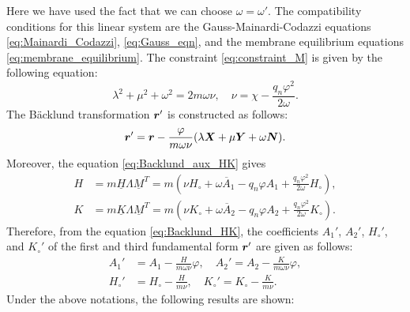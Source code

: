 \documentclass[a4paper]{amsart}
\def\br{\mbox{\boldmath $r$}}
\def\bH{\underline{H}}
\def\bK{\underline{K}}
\def\uM{\underline{M}}
\def\bN{\mbox{\boldmath $N$}}
\def\bX{\mbox{\boldmath $X$}}
\def\bY{\mbox{\boldmath $Y$}}
\theoremstyle{definition}
\begin{document}
Here we have used the fact that we can choose $\omega = \omega'$.
The compatibility conditions for this linear system are the Gauss-Mainardi-Codazzi equations \eqref{eq:Mainardi_Codazzi}, \eqref{eq:Gauss_eqn}, and the membrane equilibrium equations \eqref{eq:membrane_equilibrium}.
The constraint \eqref{eq:constraint_M} is given by the following equation:
\begin{equation}
\lambda^2 + \mu^2 + \omega^2 = 2m \omega \nu, \quad
\nu = \chi - \frac{q_n \varphi^2}{2\omega}.
\end{equation}
The B\"acklund transformation $\br'$ is constructed as follows:
\begin{equation}
\label{eq:Backlund}
\br' = \br - \frac{\varphi}{m\omega\nu} (\lambda \bX + \mu \bY + \omega \bN).
\end{equation}
Moreover, the equation \eqref{eq:Backlund_aux_HK} gives
\begin{equation}
\label{eq:eqn_H_K}
\begin{aligned}
H &= m \bH \Lambda \uM^T
= m \left( \nu H_\circ + \omega \overline{A}_1 - q_n \varphi A_1 + \frac{q_n \varphi^2}{2\omega} H_\circ \right),\\
K &= m \bK \Lambda \uM^T
= m \left( \nu K_\circ + \omega \overline{A}_2 - q_n \varphi A_2 + \frac{q_n \varphi^2}{2\omega} K_\circ \right).
\end{aligned}
\end{equation}
Therefore, from the equation \eqref{eq:Backlund_HK}, the coefficients $A_1'$, $A_2'$, $H_\circ'$, and $K_\circ'$ of the first and third fundamental form $\br'$ are given as follows:
\begin{equation}
\begin{aligned}
A_1' &= A_1 - \frac{H}{m \omega \nu} \varphi, \quad
A_2' = A_2 - \frac{K}{m \omega \nu} \varphi,\\
H_\circ' &= H_\circ - \frac{H}{m \nu}, \quad
K_\circ' = K_\circ - \frac{K}{m \nu}.
\end{aligned}
\end{equation}
%
Under the above notations, the following results are shown:
%
\end{document}
